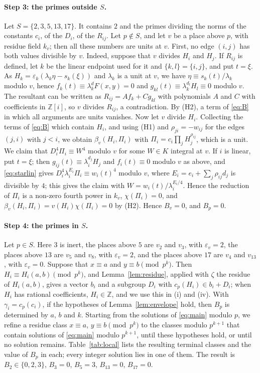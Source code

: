 \documentclass[11pt]{article}
\newcommand{\Z}{\mathbb{Z}}
\begin{document}
\paragraph{Step 3: the primes outside $S$.} Let $S=\{2,3,5,13,17\}$. It contains $2$ and the primes dividing the norms of the constants $c_i$, of the $D_i$, of the $R_{ij}$. Let $p\notin S$, and let $v$ be a place above $p$, with residue field $k_v$; then all these numbers are units at $v$. First, no edge $(i,j)$ has both values divisible by $v$. Indeed, suppose that $v$ divides $H_i$ and $H_j$. If $R_{ij}$ is defined, let $k$ be the linear endpoint used for it and $\{k,l\}=\{i,j\}$, and put $t=\xi$. As $H_k=\varepsilon_k(\lambda_k\eta-s_k(\xi))$ and $\lambda_k$ is a unit at $v$, we have $\eta\equiv s_k(t)/\lambda_k$ modulo $v$, hence $f_k(t)\equiv\lambda_k^dF(x,y)=0$ and $g_{kl}(t)\equiv\lambda_k^{d_l}H_l\equiv0$ modulo $v$. The resultant can be written as $R_{ij}=Af_k+Cg_{kl}$ with polynomials $A$ and $C$ with coefficients in $\Z[i]$, so $v$ divides $R_{ij}$, a contradiction. By (H2), a term of \eqref{eq:B} in which all arguments are units vanishes. Now let $v$ divide $H_i$. Collecting the terms of \eqref{eq:B} which contain $H_i$, and using (H1) and $\rho_{ji}=-w_{ij}$ for the edges $(j,i)$ with $j<i$, we obtain $\beta_v(H_i,\Pi_i)$ with $\Pi_i=c_i\prod_jH_j^{\rho_{ij}}$, which is a unit. We claim that $D_i^4\Pi_i\equiv W^4$ modulo $v$ for some $W\in K$ integral at $v$. If $i$ is linear, put $t=\xi$; then $g_{ij}(t)\equiv\lambda_i^{d_j}H_j$ and $f_i(t)\equiv0$ modulo $v$ as above, and \eqref{eq:starlin} gives $D_i^4\lambda_i^{E_i}\Pi_i\equiv w_i(t)^4$ modulo $v$, where $E_i=e_i+\sum_j\rho_{ij}d_j$ is divisible by $4$; this gives the claim with $W=w_i(t)/\lambda_i^{E_i/4}$. Hence the reduction of $\Pi_i$ is a non-zero fourth power in $k_v$, $\chi(\Pi_i)=0$, and $\beta_v(H_i,\Pi_i)=v(H_i)\chi(\Pi_i)=0$ by (H2). Hence $B_v=0$, and $B_p=0$.

\paragraph{Step 4: the primes in $S$.} Let $p\in S$. Here $3$ is inert, the places above $5$ are $v_{2}$ and $v_{3}$, with $\varepsilon_v=2$, the places above $13$ are $v_{5}$ and $v_{8}$, with $\varepsilon_v=2$, and the places above $17$ are $v_{4}$ and $v_{13}$, with $\varepsilon_v=0$. Suppose that $x\equiv a$ and $y\equiv b\pmod{p^k}$. Then $H_i\equiv H_i(a,b)\pmod{p^k}$, and Lemma~\ref{lem:residue}, applied with $\zeta$ the residue of $H_i(a,b)$, gives a vector $b_i$ and a subgroup $D_i$ with $c_p(H_i)\in b_i+D_i$; when $H_i$ has rational coefficients, $H_i\in\Z$, and we use this in (i) and (iv). With $\gamma_i=c_p(c_i)$, if the hypotheses of Lemma~\ref{lem:envelope} hold, then $B_p$ is determined by $a$, $b$ and $k$. Starting from the solutions of \eqref{eq:main} modulo $p$, we refine a residue class $x\equiv a$, $y\equiv b\pmod{p^k}$ to the classes modulo $p^{k+1}$ that contain solutions of \eqref{eq:main} modulo $p^{k+1}$, until these hypotheses hold, or until no solution remains. Table~\ref{tab:local} lists the resulting terminal classes and the value of $B_p$ in each; every integer solution lies in one of them. The result is $B_{2}\in\{0,2,3\}$, $B_{3}=0$, $B_{5}=3$, $B_{13}=0$, $B_{17}=0$.
\end{document}

